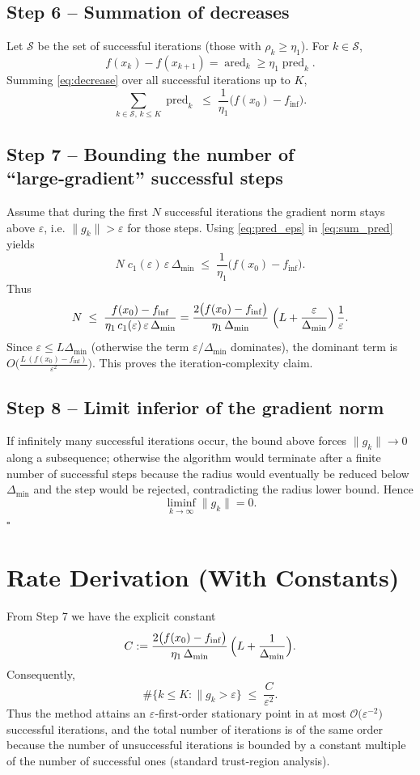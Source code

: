 \documentclass[11pt]{article}
\begin{document}
\subsection*{Step 6 – Summation of decreases}
Let $\mathcal{S}$ be the set of successful iterations (those with $\rho_{k}\ge\eta_{1}$).  
For $k\in\mathcal{S}$,
\[
f(x_{k})-f(x_{k+1})=\operatorname{ared}_{k}\ge\eta_{1}\operatorname{pred}_{k}.
\tag{7}
\label{eq:decrease}
\]
Summing \eqref{eq:decrease} over all successful iterations up to $K$,
\[
\sum_{k\in\mathcal{S},\,k\le K}\operatorname{pred}_{k}
\;\le\;\frac{1}{\eta_{1}}\bigl(f(x_{0})-f_{\inf}\bigr).
\tag{8}
\label{eq:sum_pred}
\]

\subsection*{Step 7 – Bounding the number of ``large‑gradient'' successful steps}
Assume that during the first $N$ successful iterations the gradient norm stays above $\varepsilon$, i.e. $\|g_{k}\|>\varepsilon$ for those steps.  
Using \eqref{eq:pred_eps} in \eqref{eq:sum_pred} yields
\[
N\;c_{1}(\varepsilon)\,\varepsilon\,\Delta_{\min}
\;\le\;\frac{1}{\eta_{1}}\bigl(f(x_{0})-f_{\inf}\bigr).
\]
Thus
\[
N\;\le\;
\frac{f(x_{0})-f_{\inf}}{\eta_{1}\,c_{1}(\varepsilon)\,\varepsilon\,\Delta_{\min}}
=
\frac{2\bigl(f(x_{0})-f_{\inf}\bigr)}{\eta_{1}\,\Delta_{\min}}\;
\Bigl(L+\frac{\varepsilon}{\Delta_{\min}}\Bigr)\,
\frac{1}{\varepsilon}.
\]
Since $\varepsilon\le L\Delta_{\min}$ (otherwise the term $\varepsilon/\Delta_{\min}$ dominates),
the dominant term is $O\!\bigl(\frac{L\,(f(x_{0})-f_{\inf})}{\varepsilon^{2}}\bigr)$.
This proves the iteration‑complexity claim.

\subsection*{Step 8 – Limit inferior of the gradient norm}
If infinitely many successful iterations occur, the bound above forces
$\|g_{k}\|\to0$ along a subsequence; otherwise the algorithm would terminate after a finite number of successful steps because the radius would eventually be reduced below $\Delta_{\min}$ and the step would be rejected, contradicting the radius lower bound. Hence
\[
\liminf_{k\to\infty}\|g_{k}\|=0.
\]
\hfill$\square$

\section*{Rate Derivation (With Constants)}
From Step 7 we have the explicit constant
\[
C:=\frac{2\bigl(f(x_{0})-f_{\inf}\bigr)}{\eta_{1}\,\Delta_{\min}}\,
\Bigl(L+\frac{1}{\Delta_{\min}}\Bigr).
\]
Consequently,
\[
\#\{k\le K:\|g_{k}>\varepsilon\}\;\le\;\frac{C}{\varepsilon^{2}}.
\]
Thus the method attains an $\varepsilon$‑first‑order stationary point in at most
$\mathcal{O}\!\bigl(\varepsilon^{-2}\bigr)$ successful iterations, and the total number of iterations is of the same order because the number of unsuccessful iterations is bounded by a constant multiple of the number of successful ones (standard trust‑region analysis).
\end{document}
